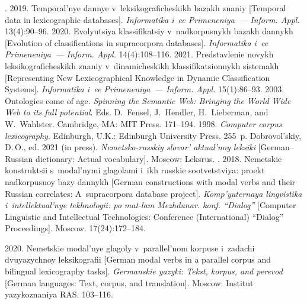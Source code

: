   \begin{multicols}{2}

\renewcommand{\bibname}{\protect\rmfamily References}

{\small\frenchspacing
 {%
 \begin{thebibliography}{99}

. 2019. Temporal'nye dannye 
v~leksikograficheskikh bazakh znaniy [Temporal data in lexicographic databases]. 
\textit{Informatika i~ee Primeneniya~--- Inform. Appl.}
 13(4):90--96.
 2020. Evolyutsiya klassifikatsiy 
v~nadkorpusnykh ba\-zakh dannykh [Evolution of classifications in supracorpora databases]. 
\textit{Informatika i~ee Primeneniya~--- Inform. Appl.} 14(4):108--116.
 2021. Predstavlenie novykh 
leksikograficheskikh znaniy v~dinamicheskikh klassifikatsionnykh sistemakh [Representing New 
Lexicographical Knowledge in Dynamic Classification Systems]. \textit{Informatika i~ee 
Primeneniya~--- Inform. Appl.} 15(1):86--93.
 2003. Ontologies come of age. \textit{Spinning the Semantic Web: 
Bringing the World Wide Web to its full potential}. Eds. D.~Fensel, J.~Hendler, 
H.~Lieberman, and W.~Wahlster. Cambridge, MA: MIT Press. 171--194.
 1998. \textit{Computer corpus lexicography}. Edinburgh, U.K.: 
Edinburgh University Press. 255~p.
Dobrovol'skiy, D.\,O., ed. 2021 (in press). \textit{Nemetsko-russkiy slovar' aktual'noy 
leksiki} [German--Russian dictionary: Actual vocabulary]. Moscow: Leksrus.
. 2018. Nemetskie konstruktsii s~modal'nymi 
glagolami i~ikh russkie sootvetstviya: proekt nadkorpusnoy bazy dannykh [German constructions 
with modal verbs and their Russian correlates: A~supracorpora database project]. 
\textit{Komp'yuternaya lingvistika i~intellektual'nye tekhnologii: po  
mat-lam Mezhdunar. konf. ``Dialog''} [Computer Linguistic and Intellectual Technologies: 
Conference (International) ``Dialog'' Proceedings]. Moscow. 17(24):172--184.
{

}
 2020. Nemetskie modal'nye glagoly v~parallel'nom korpuse 
i~zadachi dvuyazychnoy leksikografii [German modal verbs in a parallel corpus and bilingual 
lexicography tasks]. \textit{Germanskie yazyki: Tekst, korpus, and perevod} [German languages: 
Text, corpus, and translation]. Moscow: Institut yazykoznaniya RAS. 103--116.
{

}
\end{thebibliography}}}
\end{multicols}
